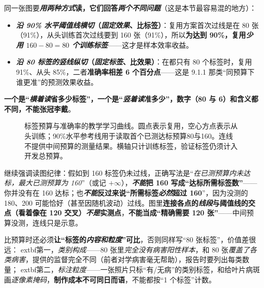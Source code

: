 同一张图要\textbf{\emph{用两种方式}读，它们回答\emph{两个不同问题}}（这是本节最容易混的地方）：
\begin{itemize}\item \textbf{\emph{沿 90\% 水平\emph{阈值线}横切}（\emph{固定效果}、比标签）}：复用方案首次过线是在 80 张（91\%），从头训练首次过线要到 160 张（91\%），所以\textbf{为达到 90\%，复用\emph{少用 $160-80=80$ 个训练标签}}——这才是样本效率收益。\item \textbf{\emph{沿 80 标签的\emph{竖线}纵切}（\emph{固定标签}、比效果）}：在都只有 80 个标签时，复用 91\%、从头 85\%，二者\textbf{准确率相差 6 个百分点}——这是 9.1.1 那类“同预算下谁更准”的预测效果收益。\end{itemize}
\textbf{一个是“\emph{横着读}省多少标签”，一个是“\emph{竖着读}准多少”，数字（80 与 6）和含义都不同，不能张冠李戴}。

\begin{figure}[htbp]
  \centering
  
  \caption{标签预算与准确率的教学学习曲线。圆点表示复用，空心方点表示从头训练；90\%水平参考线用于读取首个已测达标预算80与160。连线不提供中间预算的测量结果。横轴只计训练标签，验证标签仍须计入开发总预算。}
  \label{fig:ket-reuse-learning-curves}
\end{figure}

继续强调读图纪律：假如到 160 标签仍未过线，正确写法是“\emph{在已测预算内未达标，最大已测预算为 160}”（或记 $+\infty$），\textbf{\emph{不能}把 160 写成“达标所需标签数”}——你并没有在 160 达标；也\textbf{\emph{不能}反过来说“所需标签\emph{必然}超过 160}”，因为没测的 180、200 可能恰好（甚至因随机波动）过线。图里\textbf{连接各点的\emph{线段}与阈值线的交点（看着像在 120 交叉）\emph{不是}实测点}，\textbf{不能当成“精确需要 120 张”}——中间预算没测，连线只是示意。

比预算时还必须\textbf{让“标签的\emph{内容和粒度}”可比}，否则同样写“80 张标签”，价值差很远：	extbf{第一，\emph{类别构成}}——80 张里\emph{完全没有病害阳性样本}，和 80 张\emph{覆盖了各类病害}，提供的监督完全不同（前者对学病害毫无帮助），报告时要列出每类数量；	extbf{第二，\emph{标注粒度}}——一张照片只标“有/无病”的类别标签，和给叶片病斑画\emph{逐像素掩码}，\textbf{制作成本不可同日而语}，不能都按“1 个标签”计数。

